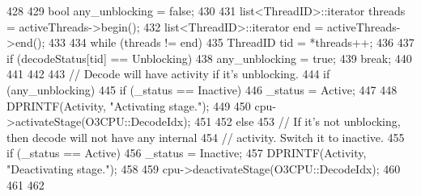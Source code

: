 \begin{DoxyCode}
428 {
429     bool any_unblocking = false;
430 
431     list<ThreadID>::iterator threads = activeThreads->begin();
432     list<ThreadID>::iterator end = activeThreads->end();
433 
434     while (threads != end) {
435         ThreadID tid = *threads++;
436 
437         if (decodeStatus[tid] == Unblocking) {
438             any_unblocking = true;
439             break;
440         }
441     }
442 
443     // Decode will have activity if it's unblocking.
444     if (any_unblocking) {
445         if (_status == Inactive) {
446             _status = Active;
447 
448             DPRINTF(Activity, "Activating stage.\n");
449 
450             cpu->activateStage(O3CPU::DecodeIdx);
451         }
452     } else {
453         // If it's not unblocking, then decode will not have any internal
454         // activity.  Switch it to inactive.
455         if (_status == Active) {
456             _status = Inactive;
457             DPRINTF(Activity, "Deactivating stage.\n");
458 
459             cpu->deactivateStage(O3CPU::DecodeIdx);
460         }
461     }
462 }
\end{DoxyCode}


